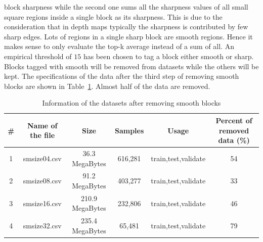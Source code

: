 block sharpness while the second one sums all
the sharpness values of all small square regions inside a
single block as its sharpness.
This is due to the consideration that in depth maps typically
the sharpness is contributed by few sharp edges.
Lots of regions in a single sharp block are smooth regions.
Hence it makes sense to only evaluate the top-k average
instead of a sum of all.
An empirical threshold of \(15\) has been chosen to tag a block
either smooth or sharp.
Blocks tagged with smooth will be removed from datasets
while the others will be kept.
The specifications of the data after the third step
of removing smooth blocks
are shown in Table~\ref{tab:datasets-after-third-step}.
Almost half of the data are removed.
\begin{table}[H]
    \caption{Information of the datasets after removing smooth blocks}
    \bigskip\label{tab:datasets-after-third-step}
    \centering
    \begin{tabular}{c c c c c c}
        \toprule
        \# & Name of the file & Size & Samples & Usage & Percent of removed data (\%) \\
        \midrule
        1 & smsize04.csv & 36.3 MegaBytes & 616,281 & train,test,validate & 54 \\
        2 & smsize08.csv & 91.2 MegaBytes & 403,277 & train,test,validate & 33 \\
        3 & smsize16.csv & 210.9 MegaBytes & 232,806 & train,test,validate & 46 \\
        4 & smsize32.csv & 235.4 MegaBytes & 65,481 & train,test,validate & 79 \\
        \bottomrule
    \end{tabular}
\end{table}

